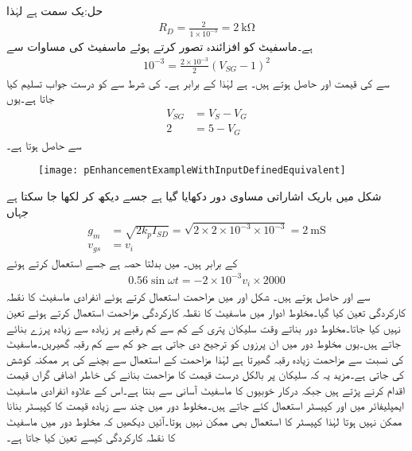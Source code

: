 حل:یک سمت  ہے لہٰذا
\begin{align*}
R_D=\frac{2}{1 \times 10^{-3}}=\SI{2}{\kilo \ohm}
\end{align*}
ہے۔ماسفیٹ کو افزائندہ تصور کرتے ہوئے ماسفیٹ کی مساوات سے
\begin{align*}
10^{-3}=\frac{2 \times 10^{-3}}{2} \left( V_{SG}-1\right)^2
\end{align*}
سے  کی قیمت  اور  حاصل ہوتے ہیں۔ ہے لہٰذا  کے برابر ہے۔ کی شرط سے  کو درست جواب تسلیم کیا جاتا ہے۔یوں
\begin{align*}
V_{SG} &=V_S-V_G \\
2&=5-V_G
\end{align*}
سے  حاصل ہوتا ہے۔
\begin{figure}
\centering
\texttt{[image: pEnhancementExampleWithInputDefinedEquivalent]}
\caption{}
\label{شکل_ماسفیٹ_جمع_ماسفیٹ_مثال_درکار_مداخل_الف}
\end{figure}
شکل  میں باریک اشاراتی مساوی دور دکھایا گیا ہے جسے دیکھ کر  لکھا جا سکتا ہے جہاں
\begin{align*}
g_m&=\sqrt{2 k_p I_{SD}}=\sqrt{2 \times 2 \times 10^{-3} \times 10^{-3}}=\SI{2}{\milli \siemens}\\
v_{gs}&=v_i
\end{align*}
کے برابر ہیں۔ میں بدلتا حصہ  ہے جسے استعمال کرتے ہوئے
\begin{align*}
0.56 \sin \omega t =-2 \times 10^{-3} v_i \times  2000
\end{align*}
سے  اور  حاصل ہوتے ہیں۔
شکل  اور  میں مزاحمت استعمال کرتے ہوئے انفرادی ماسفیٹ کا نقطہ کارکردگی  تعین کیا گیا۔مخلوط ادوار میں ماسفیٹ کا نقطہ کارکردگی مزاحمت استعمال کرتے ہوئے تعین نہیں کیا جاتا۔مخلوط دور بناتے وقت سلیکان پتری کے کم سے کم رقبے پر زیادہ سے زیادہ پرزے بنائے جاتے ہیں۔یوں مخلوط دور میں ان پرزوں کو ترجیح دی جاتی ہے جو کم سے کم رقبہ گھیریں۔ماسفیٹ کی نسبت سے مزاحمت زیادہ رقبہ گھیرتا ہے لہٰذا مزاحمت کے استعمال سے بچنے کی ہر ممکنہ  کوشش کی جاتی ہے۔مزید یہ کہ سلیکان پر بالکل درست قیمت کا مزاحمت بنانے کی خاطر اضافی گراں قیمت اقدام کرنے پڑتے ہیں جبکہ درکار خوبیوں کا ماسفیٹ آسانی سے  بنتا ہے۔اس کے علاوہ انفرادی ماسفیٹ ایمپلیفائر میں  اور  کپیسٹر استعمال کئے جاتے ہیں۔مخلوط دور میں چند  سے زیادہ قیمت کا کپیسٹر بنانا ممکن نہیں ہوتا لہٰذا کپیسٹر کا استعمال بھی ممکن نہیں ہوتا۔آئیں دیکھیں کہ مخلوط دور میں ماسفیٹ کا نقطہ کارکردگی کیسے تعین کیا جاتا ہے۔
  
